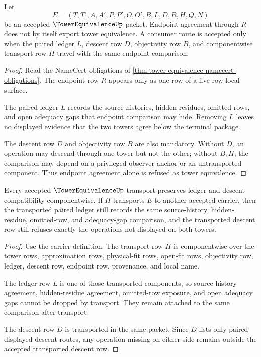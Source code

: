 \begin{theorem}
\label{thm:tower-equivalence-endpoint-refusal}
Let
$$
E=(T,T',A,A',P,P',O,O',B,L,D,R,H,Q,N)
$$
be an accepted $\TowerEquivalenceUp$ packet. Endpoint agreement through $R$ does not by itself export tower equivalence. A consumer route is accepted only when the paired ledger $L$, descent row $D$, objectivity row $B$, and componentwise transport row $H$ travel with the same endpoint comparison.
\end{theorem}
\begin{proof}
Read the NameCert obligations of \autoref{thm:tower-equivalence-namecert-obligations}. The endpoint row $R$ appears only as one row of a five-row local surface.

The paired ledger $L$ records the source histories, hidden residues, omitted rows, and open adequacy gaps that endpoint comparison may hide. Removing $L$ leaves no displayed evidence that the two towers agree below the terminal package.

The descent row $D$ and objectivity row $B$ are also mandatory. Without $D$, an operation may descend through one tower but not the other; without $B,H$, the comparison may depend on a privileged observer anchor or an untransported component. Thus endpoint agreement alone is refused as tower equivalence.
\end{proof}

\begin{theorem}
\label{thm:tower-equivalence-ledger-descent-stability}
Every accepted $\TowerEquivalenceUp$ transport preserves ledger and descent compatibility componentwise. If $H$ transports $E$ to another accepted carrier, then the transported paired ledger still records the same source-history, hidden-residue, omitted-row, and adequacy-gap comparison, and the transported descent row still refuses exactly the operations not displayed on both towers.
\end{theorem}
\begin{proof}
Use the carrier definition. The transport row $H$ is componentwise over the tower rows, approximation rows, physical-fit rows, open-fit rows, objectivity row, ledger, descent row, endpoint row, provenance, and local name.

The ledger row $L$ is one of those transported components, so source-history agreement, hidden-residue agreement, omitted-row exposure, and open adequacy gaps cannot be dropped by transport. They remain attached to the same comparison after transport.

The descent row $D$ is transported in the same packet. Since $D$ lists only paired displayed descent routes, any operation missing on either side remains outside the accepted transported descent row.
\end{proof}

